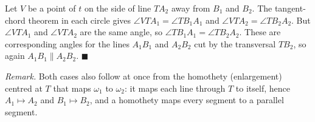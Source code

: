 Let $V$ be a point of $t$ on the side of line $TA_2$ away from $B_1$ and $B_2$. The tangent-chord theorem in each circle gives $\angle VTA_1=\angle TB_1A_1$ and $\angle VTA_2=\angle TB_2A_2$. But $\angle VTA_1$ and $\angle VTA_2$ are the same angle, so $\angle TB_1A_1=\angle TB_2A_2$. These are corresponding angles for the lines $A_1B_1$ and $A_2B_2$ cut by the transversal $TB_2$, so again $A_1B_1\parallel A_2B_2$. $\blacksquare$

\emph{Remark.} Both cases also follow at once from the homothety (enlargement) centred at $T$ that maps $\omega_1$ to $\omega_2$: it maps each line through $T$ to itself, hence $A_1\mapsto A_2$ and $B_1\mapsto B_2$, and a homothety maps every segment to a parallel segment.
